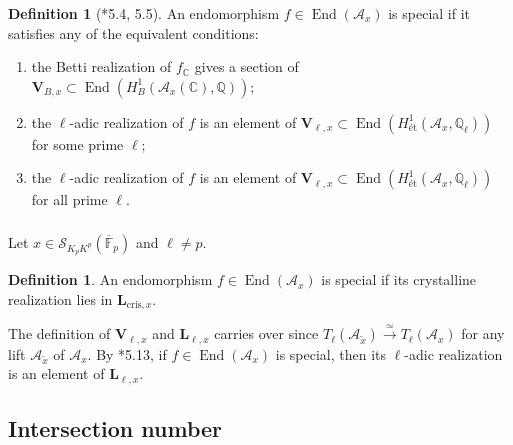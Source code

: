 \documentclass{amsart}
\numberwithin{equation}{subsection}
\numberwithin{theorem}{section}
\theoremstyle{definition}
\newtheorem{defn}[theorem]{Definition}
\theoremstyle{remark}
\newcommand{\bC}{\mathbb{C}}
\newcommand{\bF}{\mathbb{F}}
\newcommand{\bQ}{\mathbb{Q}}
\newcommand{\cA}{\mathcal{A}}
\newcommand{\et}{{\text{\'et}}}
\DeclareMathOperator{\End}{End}
\begin{document}
\begin{defn}[\cite{MR3484114}*{5.4, 5.5}]
    An endomorphism $f\in \End(\cA_x)$ is special if it satisfies any of the equivalent conditions: \begin{enumerate}
        \item the Betti realization of $f_{\bC}$ gives a section of $\bm{V}_{B,x} \subset \End(H^1_B(\mathcal{A}_{x}(\bC), \bQ))$; 
        \item the $\ell$-adic realization of $f$ is an element of $\bm{V}_{\ell,x} \subset \End(H^1_{\et}(\mathcal{A}_{x}, \bQ_\ell))$ for some prime $\ell$;
        \item the $\ell$-adic realization of $f$ is an element of $\bm{V}_{\ell,x} \subset \End(H^1_{\et}(\mathcal{A}_{x}, \bQ_\ell))$ for all prime $\ell$.
    \end{enumerate}
\end{defn}

\subsubsection{}
Let $x\in \mathscr{S}_{K_pK^p}(\overline{\bF}_p)$ and $\ell \neq p$. 

\begin{defn}
    An endomorphism $f\in \End(\cA_x)$ is special if its crystalline realization lies in $\bm{L}_{\mathrm{cris},x}$. 
\end{defn}
The definition of $\bm{V}_{\ell,x}$ and $ \bm{L}_{\ell,x}$ carries over since $T_\ell(\cA_{\tilde{x}}) \xrightarrow{\simeq }T_\ell(\cA_x)$ for any lift $\cA_{\tilde{x}}$ of $\cA_x$. 
By \cite{MR3484114}*{5.13}, if $f\in \End(\cA_x)$ is special, then its $\ell$-adic realization is an element of $\bm{L}_{\ell,x}$. 

\subsection{Intersection number}
\end{document}
